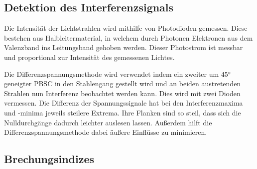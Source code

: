     \subsection{Detektion des Interferenzsignals}
        Die Intensität der Lichtstrahlen wird mithilfe von Photodioden gemessen. Diese bestehen aus Halbleitermaterial, in welchem durch Photonen Elektronen aus dem Valenzband ins Leitungsband gehoben werden. Dieser Photostrom ist messbar und proportional zur Intensität des gemessenen Lichtes.

        Die Differenzspannungsmethode wird verwendet indem ein zweiter um 45° geneigter PBSC in den Stahlengang gestellt wird und an beiden austretenden Strahlen nun Interferenz beobachtet werden kann.
        Dies wird mit zwei Dioden vermessen.
        Die Differenz der Spannungssignale hat bei den Interferenzmaxima und -minima jeweils steilere Extrema.
        Ihre Flanken sind so steil, dass sich die Nulldurchgänge dadurch leichter auslesen lassen.
        Außerdem hilft die Differenzspannungsmethode dabei äußere Einflüsse zu minimieren.

    \subsection{Brechungsindizes}
